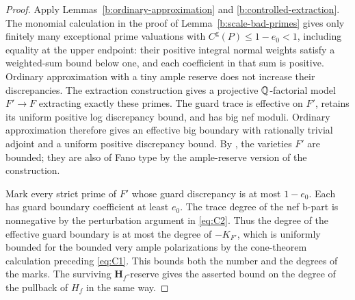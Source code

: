 \begin{proof}
Apply Lemmas~\ref{b:ordinary-approximation} and
\ref{b:controlled-extraction}. The monomial calculation in the proof of
Lemma~\ref{b:scale-bad-primes} gives only finitely many exceptional
prime valuations with \(C^{\mathrm g}(P)\leq1-e_0<1\), including
equality at the upper endpoint: their positive integral normal weights
satisfy a weighted-sum bound below one, and each coefficient in that
sum is positive.
Ordinary approximation with a tiny ample reserve does not increase their
discrepancies. The extraction construction gives a projective
\(\mathbb Q\)-factorial model \(F'\to F\) extracting exactly these primes.
The guard trace is effective on \(F'\), retains its uniform positive
log discrepancy bound, and has big nef moduli. Ordinary approximation
therefore gives an effective big boundary with rationally trivial adjoint
and a uniform positive discrepancy bound. By
\cite[Corollary~1.4]{BirkarBAB}, the varieties \(F'\) are bounded; they
are also of Fano type by the ample-reserve version of the construction.

Mark every strict prime of \(F'\) whose guard discrepancy is at most
\(1-e_0\). Each has guard boundary coefficient at least \(e_0\).
The trace degree of the nef b-part is nonnegative by the perturbation
argument in \eqref{eq:C2}. Thus the degree of the effective guard boundary
is at most the degree of \(-K_{F'}\), which is uniformly bounded for the
bounded very ample polarizations by the cone-theorem calculation preceding
\eqref{eq:C1}. This bounds both the number and the degrees of the marks.
The surviving \(\mathbf H_f\)-reserve gives the asserted bound on the
degree of the pullback of \(H_f\) in the same way.
\end{proof}

